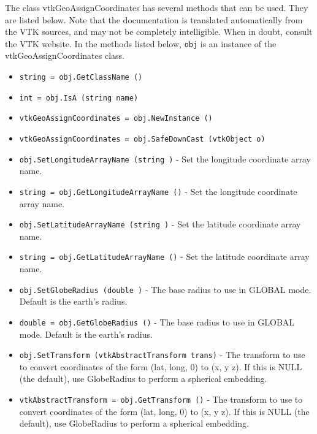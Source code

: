 The class vtkGeoAssignCoordinates has several methods that can be used.
  They are listed below.
Note that the documentation is translated automatically from the VTK sources,
and may not be completely intelligible.  When in doubt, consult the VTK website.
In the methods listed below, \verb|obj| is an instance of the vtkGeoAssignCoordinates class.
\begin{itemize}
\item  \verb|string = obj.GetClassName ()|

\item  \verb|int = obj.IsA (string name)|

\item  \verb|vtkGeoAssignCoordinates = obj.NewInstance ()|

\item  \verb|vtkGeoAssignCoordinates = obj.SafeDownCast (vtkObject o)|

\item  \verb|obj.SetLongitudeArrayName (string )| -  Set the longitude coordinate array name. 

\item  \verb|string = obj.GetLongitudeArrayName ()| -  Set the longitude coordinate array name. 

\item  \verb|obj.SetLatitudeArrayName (string )| -  Set the latitude coordinate array name. 

\item  \verb|string = obj.GetLatitudeArrayName ()| -  Set the latitude coordinate array name. 

\item  \verb|obj.SetGlobeRadius (double )| -  The base radius to use in GLOBAL mode.
 Default is the earth's radius.

\item  \verb|double = obj.GetGlobeRadius ()| -  The base radius to use in GLOBAL mode.
 Default is the earth's radius.

\item  \verb|obj.SetTransform (vtkAbstractTransform trans)| -  The transform to use to convert coordinates of the form
 (lat, long, 0) to (x, y z). If this is NULL (the default),
 use GlobeRadius to perform a spherical embedding.

\item  \verb|vtkAbstractTransform = obj.GetTransform ()| -  The transform to use to convert coordinates of the form
 (lat, long, 0) to (x, y z). If this is NULL (the default),
 use GlobeRadius to perform a spherical embedding.


\end{itemize}
